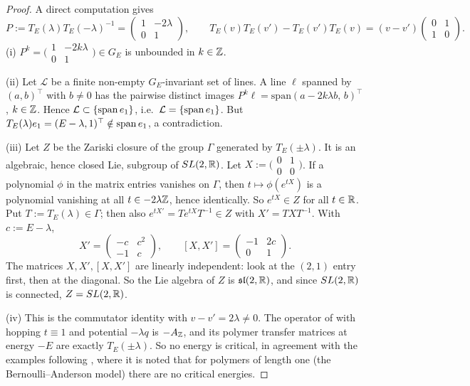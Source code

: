 \begin{proof}
A direct computation gives
\[
  P:=T_E(\lambda)T_E(-\lambda)^{-1}=\begin{pmatrix}1&-2\lambda\\0&1\end{pmatrix},\qquad
  T_E(v)T_E(v')-T_E(v')T_E(v)=(v-v')\begin{pmatrix}0&1\\1&0\end{pmatrix}.
\]
(i) $P^k=\bigl(\begin{smallmatrix}1&-2k\lambda\\0&1\end{smallmatrix}\bigr)\in G_E$ is unbounded in $k\in\mathbb{Z}$.

(ii) Let $\mathcal L$ be a finite non-empty $G_E$-invariant set of lines.  A line $\ell$ spanned by $(a,b)^\top$
with $b\ne0$ has the pairwise distinct images $P^k\ell=\mathrm{span}(a-2k\lambda b,\,b)^\top$, $k\in\mathbb{Z}$.
Hence $\mathcal L\subset\{\mathrm{span}\,e_1\}$, i.e.\ $\mathcal L=\{\mathrm{span}\,e_1\}$.  But
$T_E(\lambda)e_1=(E-\lambda,1)^\top\notin\mathrm{span}\,e_1$, a contradiction.

(iii) Let $Z$ be the Zariski closure of the group $\Gamma$ generated by $T_E(\pm\lambda)$.  It is an
algebraic, hence closed Lie, subgroup of $SL(2,\mathbb{R})$.  Let $X:=\bigl(\begin{smallmatrix}0&1\\0&0\end{smallmatrix}\bigr)$.
If a polynomial $\phi$ in the matrix entries vanishes on $\Gamma$, then $t\mapsto\phi(e^{tX})$ is a polynomial
vanishing at all $t\in-2\lambda\mathbb{Z}$, hence identically.  So $e^{tX}\in Z$ for all $t\in\mathbb{R}$.  Put
$T:=T_E(\lambda)\in\Gamma$; then also $e^{tX'}=Te^{tX}T^{-1}\in Z$ with $X'=TXT^{-1}$.  With $c:=E-\lambda$,
\[
  X'=\begin{pmatrix}-c&c^2\\-1&c\end{pmatrix},\qquad [X,X']=\begin{pmatrix}-1&2c\\0&1\end{pmatrix}.
\]
The matrices $X,X',[X,X']$ are linearly independent: look at the $(2,1)$ entry first, then at the diagonal.
So the Lie algebra of $Z$ is $\mathfrak{sl}(2,\mathbb{R})$, and since $SL(2,\mathbb{R})$ is connected, $Z=SL(2,\mathbb{R})$.

(iv) This is the commutator identity with $v-v'=2\lambda\ne0$.  The operator of
\cite[Eq.~(2)]{JSBS2003} with hopping $t\equiv1$ and potential $-\lambda q$ is $-A_{\mathbb{Z}}$, and its polymer
transfer matrices \cite[Eq.~(3)]{JSBS2003} at energy $-E$ are exactly $T_E(\pm\lambda)$.  So no energy is
critical, in agreement with the examples following \cite[Def.~1]{JSBS2003}, where it is noted that
for polymers of length one (the Bernoulli--Anderson model) there are no critical energies.


\end{proof}
